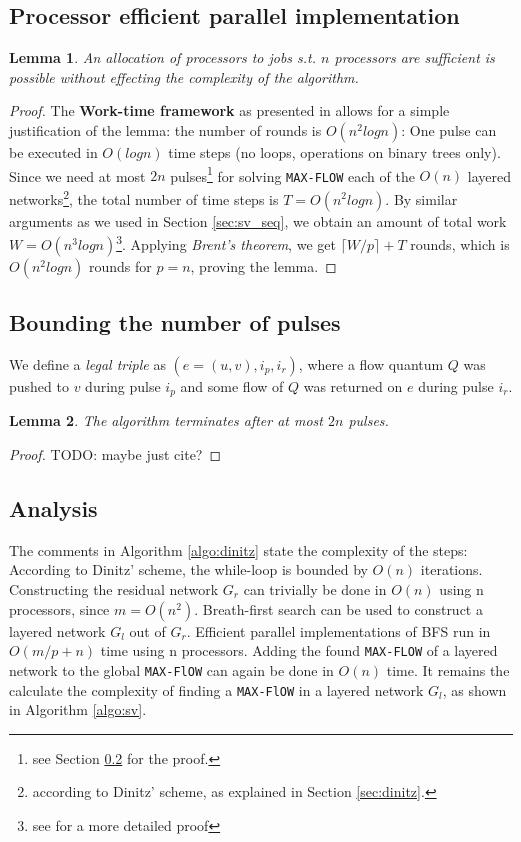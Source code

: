 \documentclass[a4paper,10pt, twocolumn]{article}
\newtheorem{lemma}{Lemma}
\begin{document}
\subsection{Processor efficient parallel implementation}
\label{sec:sv_nr_procs}
\begin{lemma}
An allocation of processors to jobs s.t. $n$ processors are sufficient is possible without effecting the complexity of the algorithm. 
\end{lemma}
\begin{proof}
The \textbf{Work-time framework} as presented in \cite{vishkin92} allows for a simple justification of the lemma: the number of rounds is $O(n^2 log n)$: One pulse can be executed in $O(log n)$ time steps (no loops, operations on binary trees only). Since we need at most $2n$ pulses\footnote{see Section \ref{sec:sv_nr_pulses} for the proof.} for solving \lstinline|MAX-FLOW| each of the $O(n)$ layered networks\footnote{according to Dinitz' scheme, as explained in Section \ref{sec:dinitz}.}, the total number of time steps is $T = O(n^{2} log n)$. By similar arguments as we used in Section \ref{sec:sv_seq}, we obtain an amount of total work $W = O(n^{3} log n)$\footnote{see \cite{yossi81} for a more detailed proof}. Applying \emph{Brent's theorem}\cite{Brent74}, we get $\lceil W/p \rceil + T$ rounds, which is $O(n^{2} log n)$ rounds for $p=n$, proving the lemma.
\end{proof}

\subsection{Bounding the number of pulses}
\label{sec:sv_nr_pulses}
We define a \emph{legal triple} as $(e =(u,v), i_p, i_r)$, where a flow quantum $Q$ was pushed to $v$ during pulse $i_p$ and some flow of $Q$ was returned on $e$ during pulse $i_r$. 

\begin{lemma}
The algorithm terminates after at most $2n$ pulses.\cite{yossi81}
\end{lemma}
\label{lemma:bounding}
\begin{proof}
TODO: maybe just cite?
\end{proof} 

\subsection{Analysis}
\label{sec:sv_analysis}
The comments in Algorithm \ref{algo:dinitz} state the complexity of the steps: According to Dinitz' scheme, the while-loop is bounded by $O(n)$ iterations. Constructing the residual network $G_r$ can trivially be done in $O(n)$ using n processors, since $m = O(n^{2})$. Breath-first search can be used to construct a layered network $G_l$ out of $G_r$. Efficient parallel implementations of BFS run in $O(m/p +n)$ time using n processors. Adding the found \lstinline|MAX-FLOW| of a layered network to the global \lstinline|MAX-FlOW| can again be done in $O(n)$ time. It remains the calculate the complexity of finding a \lstinline|MAX-FlOW| in a layered network $G_l$, as shown in Algorithm \ref{algo:sv}.
\end{document}

